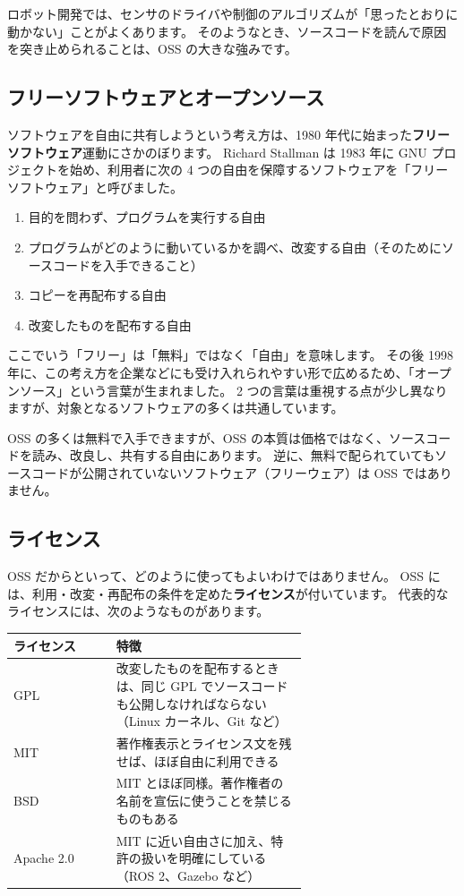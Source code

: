 ロボット開発では、センサのドライバや制御のアルゴリズムが「思ったとおりに動かない」ことがよくあります。
そのようなとき、ソースコードを読んで原因を突き止められることは、OSS の大きな強みです。

\subsection{フリーソフトウェアとオープンソース}

ソフトウェアを自由に共有しようという考え方は、1980 年代に始まった\textbf{フリーソフトウェア}運動にさかのぼります。
Richard Stallman は 1983 年に GNU プロジェクトを始め、利用者に次の 4 つの自由を保障するソフトウェアを「フリーソフトウェア」と呼びました。

\begin{enumerate}
  \item 目的を問わず、プログラムを実行する自由
  \item プログラムがどのように動いているかを調べ、改変する自由（そのためにソースコードを入手できること）
  \item コピーを再配布する自由
  \item 改変したものを配布する自由
\end{enumerate}

ここでいう「フリー」は「無料」ではなく「自由」を意味します。
その後 1998 年に、この考え方を企業などにも受け入れられやすい形で広めるため、「オープンソース」という言葉が生まれました。
2 つの言葉は重視する点が少し異なりますが、対象となるソフトウェアの多くは共通しています。

\begin{point}
  OSS の多くは無料で入手できますが、OSS の本質は価格ではなく、ソースコードを読み、改良し、共有する自由にあります。
  逆に、無料で配られていてもソースコードが公開されていないソフトウェア（フリーウェア）は OSS ではありません。
\end{point}

\subsection{ライセンス}

OSS だからといって、どのように使ってもよいわけではありません。
OSS には、利用・改変・再配布の条件を定めた\textbf{ライセンス}が付いています。
代表的なライセンスには、次のようなものがあります。

\begin{center}
  \begin{tabular}{lp{0.65\linewidth}}
    \toprule
    ライセンス & 特徴 \\
    \midrule
    GPL & 改変したものを配布するときは、同じ GPL でソースコードも公開しなければならない（Linux カーネル、Git など） \\
    MIT & 著作権表示とライセンス文を残せば、ほぼ自由に利用できる \\
    BSD & MIT とほぼ同様。著作権者の名前を宣伝に使うことを禁じるものもある \\
    Apache 2.0 & MIT に近い自由さに加え、特許の扱いを明確にしている（ROS 2、Gazebo など） \\
    \bottomrule
  \end{tabular}
\end{center}

